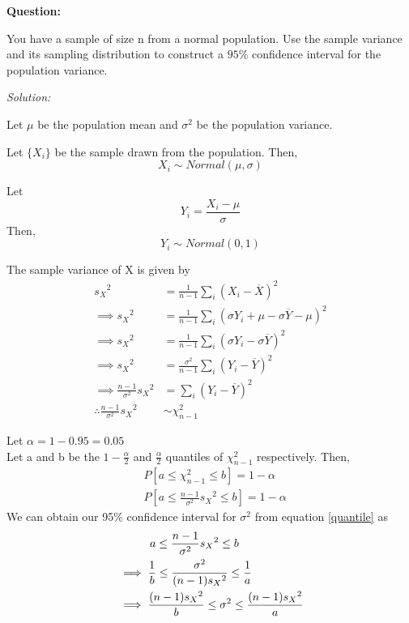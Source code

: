 \documentclass[12pt,letterpaper]{article}
\begin{document}
\textbf{Question:}

You have a sample of size n from a normal population. Use the sample variance and its sampling distribution to construct a $95\%$ confidence interval for the population variance.
\vspace{2em}

\textit{Solution:}

Let $\mu$ be the population mean and $\sigma^2$ be the population variance.

Let $\{X_i\}$ be the sample drawn from the population. Then,
$$X_i \sim Normal(\mu, \sigma)$$

Let
$$Y_i = \frac{X_i - \mu}{\sigma}$$
Then,
$$Y_i \sim Normal(0, 1)$$

The sample variance of X is given by
\begin{equation}
  \begin{split}
    {s_X}^2 &= \frac{1}{n-1}\sum_i (X_i - \overline{X})^2\\
    \implies {s_X}^2 &= \frac{1}{n-1}\sum_i (\sigma Y_i + \mu - \sigma \overline{Y} - \mu)^2\\
    \implies {s_X}^2 &= \frac{1}{n-1}\sum_i (\sigma Y_i - \sigma \overline{Y})^2\\
    \implies {s_X}^2 &= \frac{\sigma^2}{n-1}\sum_i (Y_i - \overline{Y})^2\\
    \implies \frac{n - 1}{\sigma^2}{s_X}^2 &= \sum_i (Y_i - \overline{Y})^2\\
    \therefore \frac{n - 1}{\sigma^2}{s_X}^2 &\sim \chi_{n-1}^2
  \end{split}
\end{equation}

Let $\alpha = 1 - 0.95 = 0.05$\\
Let a and b be the $1 - \frac{\alpha}{2}$ and $\frac{\alpha}{2}$ quantiles of $\chi_{n-1}^2$ respectively. Then,
\begin{equation}
  \begin{split}
    &P[a \leq \chi_{n-1}^2 \leq b] = 1 - \alpha\\
    &P[a \leq \frac{n - 1}{\sigma^2}{s_X}^2 \leq b] = 1 - \alpha
  \end{split}
  \label{quantile}
\end{equation}
We can obtain our 95\% confidence interval for $\sigma^2$ from equation \ref{quantile} as
\begin{equation}
  \begin{split}
    &\hspace{2.9em} a \leq \frac{n - 1}{\sigma^2}{s_X}^2 \leq b\\
    &\implies \frac{1}{b} \leq \frac{\sigma^2}{(n - 1){s_X}^2} \leq \frac{1}{a}\\
    &\implies \frac{(n - 1){s_X}^2}{b} \leq \sigma^2 \leq \frac{(n - 1){s_X}^2}{a}
  \end{split}
\end{equation}
\end{document}
